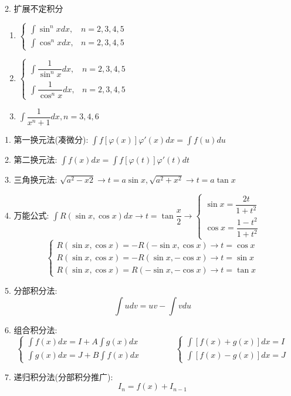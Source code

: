 \begin{theorem}[常用不定积分]
\begin{enumerate}
	\end{enumerate}
	2. 扩展不定积分
	\begin{enumerate}
		\item $\begin{cases} \int \sin^{n} xdx, & n = 2,3,4,5   \\ \int \cos^{n} xdx, & n = 2,3,4,5 \end{cases}$
		\item $\begin{cases} \int \dfrac{1}{\sin^{n} x}dx, & n = 2,3,4,5   \\ \int \dfrac{1}{\cos^{n} x}dx, & n = 2,3,4,5 \end{cases}$
		\item $\int \dfrac{1}{x^{n}+1} dx , n = 3,4,6$
	\end{enumerate}
\end{theorem}
\begin{definition}[积分方法]
	1. 第一换元法(凑微分): $\int f[\varphi(x)]\varphi'(x)dx = \int f(u)du$

	2. 第二换元法: $\int f(x)dx = \int f[\varphi(t)]\varphi'(t)dt$

	3. 三角换元法: $\sqrt{a^{2}-x{2}}\to t = a\sin x, \sqrt{a^{2}+x^{2}}\to t = a\tan x$

	4. 万能公式: $\int R(\sin x, \cos x)dx \to t = \tan \dfrac{x}{2}\to \begin{cases} \sin x = \dfrac{2t}{1+t^{2}}\\ \cos x = \dfrac{1-t^{2}}{1+t^{2}}\end{cases}$
	$$\begin{cases} R(\sin x,\cos x) = -R(-\sin x,\cos x)\to t =\cos x\\ 
		R(\sin x,\cos x) = -R(\sin x,-\cos x)\to t = \sin x\\
		R(\sin x,\cos x) = R(-\sin x,-\cos x)\to t = \tan x
	\end{cases}$$

	5. 分部积分法:
	$$\int udv = uv - \int vdu$$

	
	6. 组合积分法: 
	$$\begin{cases} \int f(x)dx = I + A\int g(x)dx  \\ \int g(x) dx= J + B\int f(x)dx \end{cases}\qquad\qquad \begin{cases} \int [f(x) + g(x)]dx = I \\ \int [f(x)-g(x)]dx =J  \end{cases}$$

	7. 递归积分法(分部积分推广): 
	$$I_{n} = f(x) + I_{n-1}$$
\end{definition}
